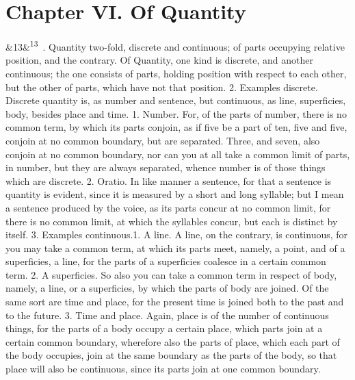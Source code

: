 \documentclass[12pt]{article}
\newcommand{\para}[1][]{\par\noindent\ifx&#1&\else\textsuperscript{\footnotesize #1}~\fi}
\begin{document}
\section*{Chapter VI. Of Quantity}

\para[13] 1. Quantity two-fold, discrete and continuous; of parts occupying relative position, and the contrary. Of Quantity, one kind is discrete, and another continuous; the one consists of parts, holding position with respect to each other, but the other of parts, which have not that position. 2. Examples discrete. Discrete quantity is, as number and sentence, but continuous, as line, superficies, body, besides place and time. 1. Number. For, of the parts of number, there is no common term, by which its parts conjoin, as if five be a part of ten, five and five, conjoin at no common boundary, but are separated. Three, and seven, also conjoin at no common boundary, nor can you at all take a common limit of parts, in number, but they are always separated, whence number is of those things which are discrete. 2. Oratio. In like manner a sentence, for that a sentence is quantity is evident, since it is measured by a short and long syllable; but I mean a sentence produced by the voice, as its parts concur at no common limit, for there is no common limit, at which the syllables concur, but each is distinct by itself. 3. Examples continuous.1. A line. A line, on the contrary, is continuous, for you may take a common term, at which its parts meet, namely, a point, and of a superficies, a line, for the parts of a superficies coalesce in a certain common term. 2. A superficies. So also you can take a common term in respect of body, namely, a line, or a superficies, by which the parts of body are joined. Of the same sort are time and place, for the present time is joined both to the past and to the future. 3. Time and place. Again, place is of the number of continuous things, for the parts of a body occupy a certain place, which parts join at a certain common boundary, wherefore also the parts of place, which each part of the body occupies, join at the same boundary as the parts of the body, so that place will also be continuous, since its parts join at one common boundary.
\end{document}
